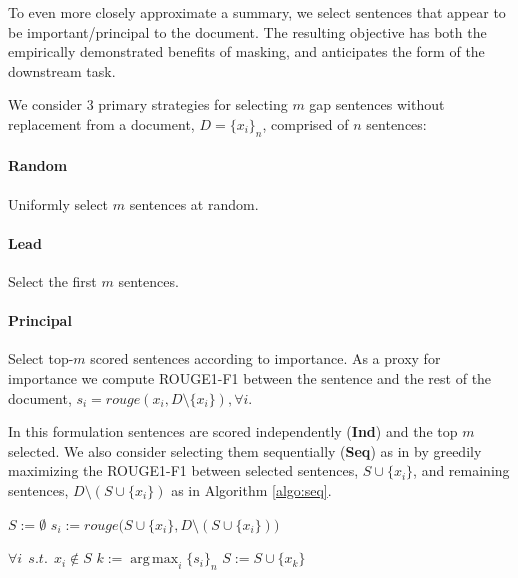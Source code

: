 \documentclass{article}
\DeclareMathOperator*{\argmax}{arg\,max}
\begin{document}
 To even
more closely approximate a summary,
we select sentences that appear to be important/principal to the document.
The resulting objective has both the
empirically
demonstrated benefits of masking, and
anticipates the form of the downstream task.
 

We consider 3 primary strategies for selecting  $m$ gap sentences without
replacement from a document, $D=\{x_i\}_n$, comprised
of $n$ sentences: 

\paragraph{Random} Uniformly select $m$ sentences at random.

\paragraph{Lead} Select the first $m$ sentences.

\paragraph{Principal} Select top-$m$ scored
sentences according to importance.  As a proxy
for importance we compute ROUGE1-F1 \citep{lin-2004-rouge}  between
the sentence and the rest of the document,
$
    s_i=rouge(x_i, D \setminus \{x_i\}), \forall i
$.

In this formulation sentences are scored independently (\textbf{Ind}) and the top $m$ selected.
We also consider selecting them sequentially (\textbf{Seq}) as in \citet{nallapati2017extractive}
by greedily maximizing the ROUGE1-F1 between
selected sentences, ${S \cup \{x_i\}}$, and  remaining sentences, ${D \setminus (S \cup \{x_i\})}$ as in Algorithm \ref{algo:seq}.

\begin{algorithm} \caption{Sequential Sentence Selection}
\label{algo:seq}
\begin{algorithmic}[1]
\STATE  $S:=\emptyset$
    \STATE $s_i := rouge\Big(S \cup \{x_i\}, D \setminus (S \cup \{x_i\})\Big)$ \par
    $\forall i~~s.t.~~x_i \notin S$
    \STATE $k := \argmax_i \{s_i\}_n$
    \STATE $S := S \cup \{x_k\}$ 
\ENDFOR
\end{algorithmic}
\end{algorithm}
\end{document}
